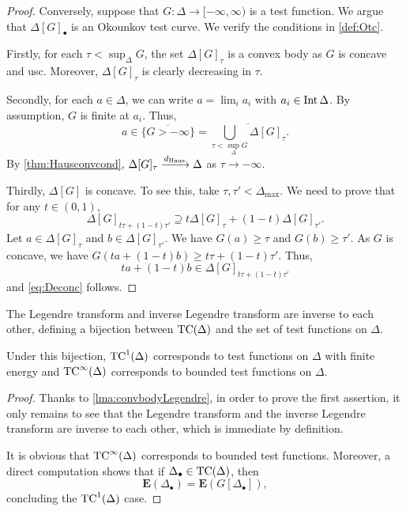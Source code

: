\begin{proof}
    Conversely, suppose that $G\colon \Delta\rightarrow [-\infty,\infty)$ is a test function. We argue that $\Delta[G]_{\bullet}$ is an Okounkov test curve. We verify the conditions in \cref{def:Otc}.

    Firstly, for each $\tau< \sup_{\Delta}G$, the set $\Delta[G]_{\tau}$ is a convex body as $G$ is concave and usc.
	Moreover, $\Delta[G]_{\tau}$ is clearly decreasing in $\tau$.

	Secondly, for each $a\in \Delta$, we can write $a=\lim_{i}a_i$ with $a_i\in \operatorname{Int} \Delta$. By assumption, $G$ is finite at $a_i$. Thus,
	\[
		a\in \overline{\{G>-\infty\}}=\overline{\bigcup_{\tau<\sup_{\Delta}G}\Delta[G]_{\tau}}.
	\]
	By \cref{thm:Hausconvcond}, $\Delta[G]_{\tau}\xrightarrow{d_{\mathrm{Haus}}}\Delta$ as $\tau\to -\infty$.

	Thirdly, $\Delta[G]$ is concave. To see this, take $\tau,\tau'< \Delta_{\max}$. We need to prove that for any $t\in (0,1)$,
	\begin{equation}\label{eq:Deconc}
		\Delta[G]_{t\tau+(1-t)\tau'}\supseteq t\Delta[G]_{\tau}+(1-t)\Delta[G]_{\tau'}.
	\end{equation}
	Let $a\in \Delta[G]_{\tau}$ and $b\in \Delta[G]_{\tau'}$. We have $G(a)\geq\tau$ and $G(b)\geq \tau'$. As $G$ is concave, we have $G(ta+(1-t)b)\geq t\tau+(1-t)\tau'$. Thus,
	\[
		ta+(1-t)b\in \Delta[G]_{t\tau+(1-t)\tau'}
	\]
	and \eqref{eq:Deconc} follows.
\end{proof}

\begin{theorem}\label{thm:Okotestcurve}
	The Legendre transform and inverse Legendre transform are inverse to each other,
	defining a bijection between $\mathrm{TC}(\Delta)$ and the set of test functions on $\Delta$.

    Under this bijection, $\mathrm{TC}^1(\Delta)$ corresponds to test functions on $\Delta$ with finite energy and $\mathrm{TC}^{\infty}(\Delta)$ corresponds to bounded test functions on $\Delta$.
\end{theorem}
\begin{proof}
    Thanks to \cref{lma:convbodyLegendre}, in order to prove the first assertion, it only remains to see that the Legendre transform and the inverse Legendre transform are inverse to each other, which is immediate by definition.

    It is obvious that $\mathrm{TC}^{\infty}(\Delta)$ corresponds to bounded test functions. Moreover, a direct computation shows that if $\Delta_{\bullet}\in \mathrm{TC}(\Delta)$, then
    \[
    \mathbf{E}(\Delta_{\bullet})=\mathbf{E}(G[\Delta_{\bullet}]),
    \]
    concluding the $\mathrm{TC}^{1}(\Delta)$ case.
\end{proof}


